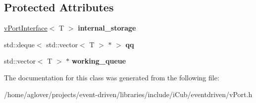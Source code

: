 \subsection*{Protected Attributes}
\begin{DoxyCompactItemize}
\item 
\hyperlink{classev_1_1vPortInterface}{v\+Port\+Interface}$<$ T $>$ {\bfseries internal\+\_\+storage}\hypertarget{classev_1_1vReadPort_acfb60faa5ca0f9799e9de0e4dc359683}{}\label{classev_1_1vReadPort_acfb60faa5ca0f9799e9de0e4dc359683}

\item 
std\+::deque$<$ std\+::vector$<$ T $>$ $\ast$ $>$ {\bfseries qq}\hypertarget{classev_1_1vReadPort_a5a6dd26199d1cf9af92f3ec496d21864}{}\label{classev_1_1vReadPort_a5a6dd26199d1cf9af92f3ec496d21864}

\item 
std\+::vector$<$ T $>$ $\ast$ {\bfseries working\+\_\+queue}\hypertarget{classev_1_1vReadPort_ab2b00ab6bd8a629ac995b039975adb01}{}\label{classev_1_1vReadPort_ab2b00ab6bd8a629ac995b039975adb01}

\end{DoxyCompactItemize}


The documentation for this class was generated from the following file\+:\begin{DoxyCompactItemize}
\item 
/home/aglover/projects/event-\/driven/libraries/include/i\+Cub/eventdriven/v\+Port.\+h\end{DoxyCompactItemize}
